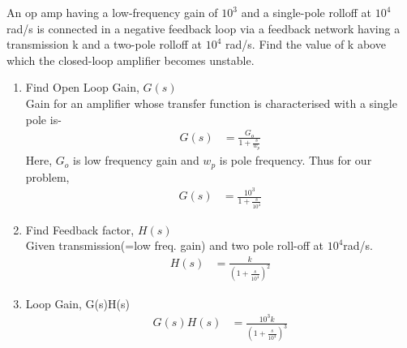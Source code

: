 An op amp having a low-frequency gain of $10^{3}$ and a single-pole rolloff at $10^{4}$ rad/s is connected in a negative feedback loop via a feedback network having a transmission k and a two-pole rolloff at $10^{4}$ rad/s. Find the value of k above which the closed-loop amplifier becomes unstable.
\begin{enumerate}[label=\arabic*.,ref=\theenumi]

\renewcommand{\thefigure}{\theenumi.\arabic{figure}}

\item Find Open Loop Gain, $G(s)$\\
\solution Gain for an amplifier whose transfer function is characterised with a single pole is-
\begin{align}
    G(s) &= \frac{G_{o}}{1+ \frac{s}{w_{p}}}
\end{align}
Here, $G_{o}$ is low frequency gain and $w_{p}$ is pole frequency. Thus for our problem,
\begin{align}
\label{eq:olg}
    G(s) &= \frac{10^3}{1+\frac{s}{10^4}}
\end{align}

\item Find Feedback factor, $H(s)$\\
\solution Given transmission(=low freq. gain) and two pole roll-off at $10^4$rad/s.
\begin{align}
    H(s)&= \frac{k}{\left(1+\frac{s}{10^4}\right)^2}
\end{align}

\item Loop Gain, G(s)H(s)\\
\solution 
\begin{align}
    G(s)H(s) &= \frac{10^3k}{\left(1+\frac{s}{10^4}\right)^3}
\end{align}


\end{enumerate}
